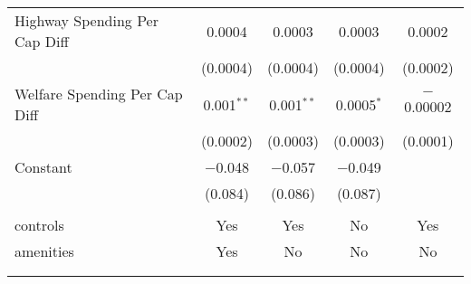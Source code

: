 \begin{table}[!htbp]
\begin{tabular}{@{\extracolsep{5pt}}lcccc}
  Highway Spending Per Cap Diff & 0.0004 & 0.0003 & 0.0003 & 0.0002 \\ 
  & (0.0004) & (0.0004) & (0.0004) & (0.0002) \\ 
  Welfare Spending Per Cap Diff & 0.001$^{**}$ & 0.001$^{**}$ & 0.0005$^{*}$ & $-$0.00002 \\ 
  & (0.0002) & (0.0003) & (0.0003) & (0.0001) \\ 
  Constant & $-$0.048 & $-$0.057 & $-$0.049 &  \\ 
  & (0.084) & (0.086) & (0.087) &  \\ 
 \hline \\[-1.8ex] 
controls & Yes & Yes & No & Yes \\ 
amenities & Yes & No & No & No \\ 
\hline \\[-1.8ex] 
\hline 
\hline \\[-1.8ex] 
\end{tabular} 
\end{table} 
